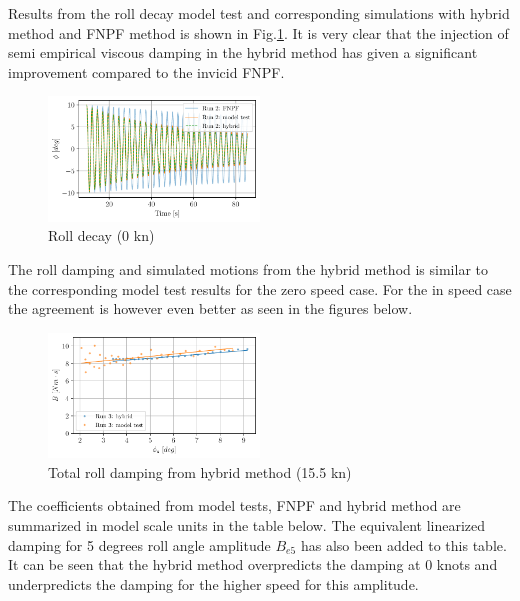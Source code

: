     Results from the roll decay model test and corresponding simulations
with hybrid method and FNPF method is shown in
Fig.\ref{fig:hybrid_0_time}. It is very clear that the injection
of semi empirical viscous damping in the hybrid method has given a
significant improvement compared to the invicid FNPF.

    

    \begin{figure}[H]
        \begin{center}\includegraphics[width = 0.5\textwidth]{figures/hybrid_0_time.pdf}\end{center}
        \vspace{-1cm}
        \caption{Roll decay (0 kn)}
        \label{fig:hybrid_0_time}
    \end{figure}
    
    The roll damping and simulated motions from the hybrid method is similar
to the corresponding model test results for the zero speed case. For the
in speed case the agreement is however even better as seen in the
figures below.

    \begin{figure}[H]
        \begin{center}\includegraphics[width = 0.5\textwidth]{figures/hybrid_speed_amplitudes.pdf}\end{center}
        \vspace{-1cm}
        \caption{Total roll damping from hybrid method (15.5 kn)}
        \label{fig:hybrid_speed_amplitudes}
    \end{figure}
    
    The coefficients obtained from model tests, FNPF and hybrid method are
summarized in model scale units in the table below. The equivalent
linearized damping for 5 degrees roll angle amplitude $B_{e5}$ has
also been added to this table. It can be seen that the hybrid method
overpredicts the damping at 0 knots and underpredicts the damping for
the higher speed for this amplitude.

    